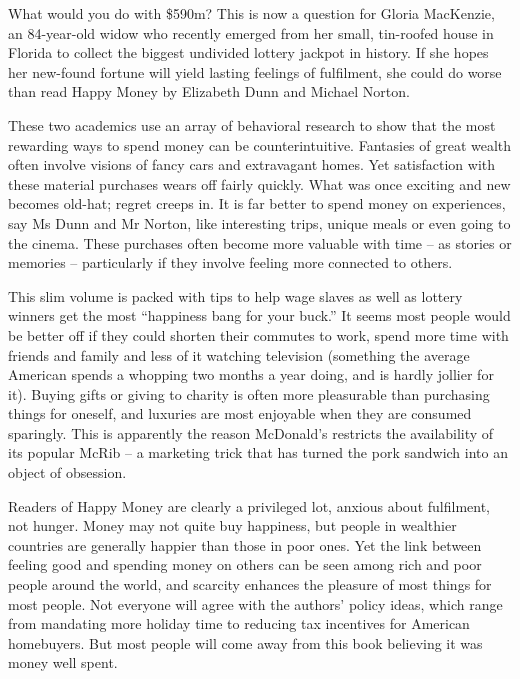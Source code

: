 What would you do with \$590m? This is now a question for Gloria MacKenzie, an 84-year-old widow who recently emerged from her small, tin-roofed house in Florida to collect the biggest undivided lottery jackpot in history. If she hopes her new-found fortune will yield lasting feelings of fulfilment, she could do worse than read Happy Money by Elizabeth Dunn and Michael Norton.


These two academics use an array of behavioral research to show that the most rewarding ways to spend money can be counterintuitive. Fantasies of great wealth often involve visions of fancy cars and extravagant homes. Yet satisfaction with these material purchases wears off fairly quickly. What was once exciting and new becomes old-hat; regret creeps in. It is far better to spend money on experiences, say Ms Dunn and Mr Norton, like interesting trips, unique meals or even going to the cinema. These purchases often become more valuable with time – as stories or memories – particularly if they involve feeling more connected to others.


This slim volume is packed with tips to help wage slaves as well as lottery winners get the most ``happiness bang for your buck.'' It seems most people would be better off if they could shorten their commutes to work, spend more time with friends and family and less of it watching television (something the average American spends a whopping two months a year doing, and is hardly jollier for it). Buying gifts or giving to charity is often more pleasurable than purchasing things for oneself, and luxuries are most enjoyable when they are consumed sparingly. This is apparently the reason McDonald's restricts the availability of its popular McRib – a marketing trick that has turned the pork sandwich into an object of obsession.


Readers of Happy Money are clearly a privileged lot, anxious about fulfilment, not hunger. Money may not quite buy happiness, but people in wealthier countries are generally happier than those in poor ones. Yet the link between feeling good and spending money on others can be seen among rich and poor people around the world, and scarcity enhances the pleasure of most things for most people. Not everyone will agree with the authors' policy ideas, which range from mandating more holiday time to reducing tax incentives for American homebuyers. But most people will come away from this book believing it was money well spent.